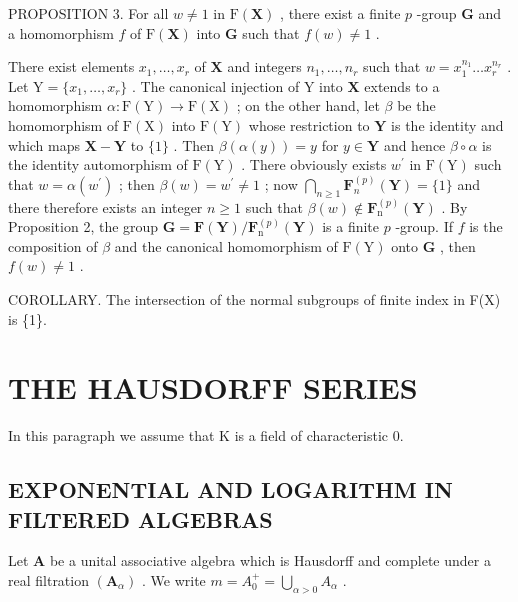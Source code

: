 PROPOSITION 3. For all \(w \neq 1\) in \(\mathrm{F}(\mathbf{X})\) , there exist a finite \(p\) -group \(\mathbf{G}\) and a homomorphism \(f\) of \(\mathrm{F}(\mathbf{X})\) into \(\mathbf{G}\) such that \(f(w) \neq 1\) .

There exist elements \(x_{1},\ldots ,x_{r}\) of \(\mathbf{X}\) and integers \(n_1,\dots ,n_r\) such that \(w = x_1^{n_1}\dots x_r^{n_r}\) . Let \(\mathrm{Y} = \{x_1,\dots,x_r\}\) . The canonical injection of \(\mathrm{Y}\) into \(\mathbf{X}\) extends to a homomorphism \(\alpha : \mathrm{F}(\mathrm{Y})\to \mathrm{F}(\mathrm{X})\) ; on the other hand, let \(\beta\) be the homomorphism of \(\mathrm{F}(\mathrm{X})\) into \(\mathrm{F}(\mathrm{Y})\) whose restriction to \(\mathbf{Y}\) is the identity and which maps \(\mathbf{X} - \mathbf{Y}\) to \(\{1\}\) . Then \(\beta (\alpha (y)) = y\) for \(y\in \mathbf{Y}\) and hence \(\beta \circ \alpha\) is the identity automorphism of \(\mathrm{F}(\mathrm{Y})\) . There obviously exists \(w^{\prime}\) in \(\mathrm{F}(\mathrm{Y})\) such that \(w = \alpha (w^{\prime})\) ; then \(\beta (w) = w^{\prime}\neq 1\) ; now \(\bigcap_{n\geqslant 1}\mathbf{F}_n^{(p)}(\mathbf{Y}) = \{1\}\) and there therefore exists an integer \(n\geqslant 1\) such that \(\beta (w)\notin \mathbf{F}_{\mathrm{n}}^{(p)}(\mathbf{Y})\) . By Proposition 2, the group \(\mathbf{G} = \mathbf{F}(\mathbf{Y}) / \mathbf{F}_{\mathrm{n}}^{(p)}(\mathbf{Y})\) is a finite \(p\) -group. If \(f\) is the composition of \(\beta\) and the canonical homomorphism of \(\mathrm{F}(\mathrm{Y})\) onto \(\mathbf{G}\) , then \(f(w)\neq 1\) .

COROLLARY. The intersection of the normal subgroups of finite index in F(X) is \{1\}.

\section{THE HAUSDORFF SERIES}

In this paragraph we assume that K is a field of characteristic 0.

\subsection{EXPONENTIAL AND LOGARITHM IN FILTERED ALGEBRAS}

Let \(\mathbf{A}\) be a unital associative algebra which is Hausdorff and complete under a real filtration \((\mathbf{A}_{\alpha})\) . We write \(m = A_0^+ = \bigcup_{\alpha > 0} A_\alpha\) .

